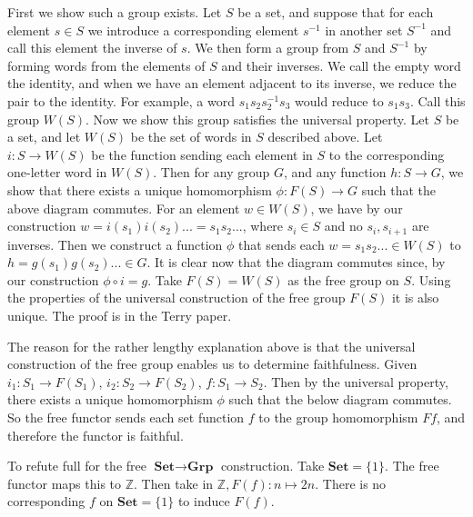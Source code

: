 \documentclass{article}
\begin{document}
First we show such a group exists. Let $S$ be a set, and suppose that for each
element $s \in S$ we introduce a corresponding element $s^{-1}$ in another set $S^{-1}$ and
call this element the inverse of $s$. We then form a group from $S$ and $S^{-1}$ by
forming words from the elements of $S$ and their inverses. We call the empty word
the identity, and when we have an element adjacent to its inverse, we reduce the
pair to the identity. For example, a word $s_1s_2s_2^{-1}s_3$ would reduce to $s_1s_3$. Call this group $W(S)$. Now we show this group satisfies the universal property.
Let $S$ be a set, and let $W(S)$ be the set of words in $S$ described above. Let
$i\colon S \rightarrow W(S)$ be the function sending each element in $S$ to the corresponding
one-letter word in $W(S)$. Then for any group $G$, and any function $h\colon S \rightarrow G$,
we show that there exists a unique homomorphism $\phi\colon F(S) \rightarrow G$ such that the
above diagram commutes. For an element $w  \in W(S)$, we have by our construction
$w = i(s_1)i(s_2) ... = s_1s_2 ...$, where $s_i \in S$ and no $s_i, s_{i+1}$ are inverses. Then we construct a function $\phi$ that sends each $w = s_1s_2 ... \in W(S)$ to $h = g(s_1)g(s_2) ... \in G$. It is clear now that the diagram commutes since, by our construction $\phi \circ i = g$. Take $F(S) = W(S)$ as the free group on $S$. Using the properties of the universal construction of the free group $F(S)$ it is also unique. The proof is in the Terry paper.

The reason for the rather lengthy explanation above is that the universal construction of the free group enables us to determine faithfulness. Given $i_1\colon S_1 \rightarrow F(S_1)$, $i_2\colon S_2 \rightarrow F(S_2)$,  $f: S_1 \rightarrow S_2$. Then by the universal property, there exists a unique homomorphism $\phi$ such that the below diagram commutes. So the free functor sends each set function $f$ to the group homomorphism $Ff$, and therefore the functor is faithful.

\begin{center}
\end{center}



To refute full for the free $\textbf{Set} \rightarrow \textbf{Grp}$ construction. Take $\mathbf{Set}=\{ 1 \}$. The free functor maps this to $\mathds{Z}$. Then take in $\mathds{Z}, F(f)\colon n \mapsto 2n$. There is no corresponding $f$ on $\mathbf{Set}=\{ 1 \}$ to induce $F(f)$.
\end{document}
